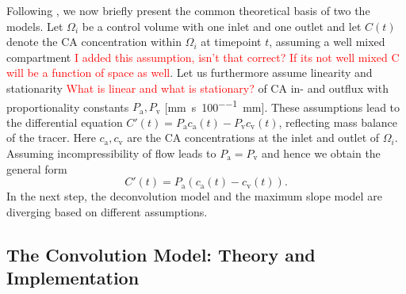 \documentclass[paper=a4, fontsize=11pt,parskip=half,headings=small]{scrartcl}
\newcommand{\ca}{c_\mathrm{a}}
\newcommand{\cout}{c_{\mathrm{v}}}
\newcommand{\Pa}{P_{\mathrm{a}}}
\newcommand{\Pout}{P_{\mathrm{v}}}
\newcommand{\siperfmm}{\milli\meter\per\second\per100\milli\meter}
\begin{document}
		
	Following \cite{sourbron13}, we now briefly present the common theoretical basis of two the models.
	Let $\Omega_i$ be a control volume with one inlet and one outlet and let $C(t)$ denote the CA concentration within $\Omega_i$ at timepoint $t$, assuming a well mixed compartment \textcolor{red}{I added this assumption, isn't that correct? If its not well mixed C will be a function of space as well}. 
	Let us furthermore assume linearity and stationarity \textcolor{red}{What is linear and what is stationary?} of CA in- and outflux with proportionality constants $\Pa, \Pout$  [\si{\siperfmm}].
	These assumptions lead to the differential equation $C'(t) = \Pa\ca(t) - \Pout\cout(t)$, reflecting mass balance of the tracer. 
	Here $\ca,\cout$ are the CA concentrations at the inlet and outlet of $\Omega_i$.
	Assuming incompressibility of flow leads to $\Pa = \Pout$ and hence we obtain the general form
	\begin{equation}
		C'(t) = \Pa\left(\ca(t) - \cout(t)\right).
		\label{eq:classicgeneral}
	\end{equation}
	In the next step, the deconvolution model and the maximum slope model are diverging based on different assumptions.

	\subsection{The Convolution Model: Theory and Implementation}\label{sec:conv}
	
\end{document}
